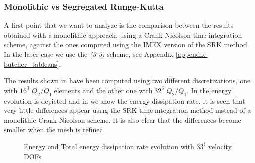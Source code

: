 \subsubsection{Monolithic vs Segregated Runge-Kutta}
\label{subsubsec-C7_TGV_mono_vs_SRK}
A first point that we want to analyze is the comparison between the results obtained with a monolithic approach, using a Crank-Nicolson time integration scheme, against the ones computed using the IMEX version of the SRK method. In the later case we use the \textit{(3-3)} scheme, see Appendix \ref{appendix-butcher_tableaus}.  

The results shown in  have been computed using two different discretizations, one with $16^3$ $Q_2/Q_1$ elements and the other one with $32^3$ $Q_2/Q_1$. In  the energy evolution is depicted and in  we show the energy dissipation rate. It is seen that very little differences appear using the SRK time integration method instead of a monolithic Crank-Nicolson scheme. It is also clear that the differences become smaller when the mesh is refined.
\begin{figure}[h!]
  \centering
  \caption{Energy and Total energy dissipation rate evolution with $33^3$ velocity DOFs}
  \label{fig-TGV_SRK_mono_ene_dis}
\end{figure}


